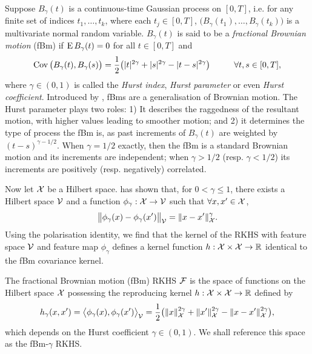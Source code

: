 Suppose $B_\gamma(t)$ is a continuous-time Gaussian process on $[0,T]$, i.e. for any finite set of indices $t_1,\dots,t_k$, where each $t_j \in [0,T]$, $\big(B_\gamma(t_1),\dots,B_\gamma(t_k)\big)$ is a multivariate normal random variable.
$B_\gamma(t)$ is said to be a \emph{fractional Brownian motion} (fBm) if $\operatorname{E} B_\gamma(t) = 0$ for all $t \in [0,T]$ and 
\[
  \operatorname{Cov}\big(B_\gamma(t),B_\gamma(s) \big) = \frac{1}{2}\big( |t|^{2\gamma} + |s|^{2\gamma} - |t-s|^{2\gamma} \big) \hspace{1cm} \forall t,s \in [0,T],
\]
where $\gamma \in (0,1)$ is called the \emph{Hurst index}, \emph{Hurst parameter} or even \emph{Hurst coefficient}.
Introduced by \citet{mandelbrot1968fractional}, fBms are a generalisation of Brownian motion.
The Hurst parameter plays two roles: 1) It describes the raggedness of the resultant motion, with higher values leading to smoother motion; and 2) it determines the type of process the fBm is, as past increments of $B_\gamma(t)$ are weighted by $(t-s)^{\gamma-1/2}$.
When $\gamma=1/2$ exactly, then the fBm is a standard Brownian motion and its increments are independent; when $\gamma > 1/2$ (resp. $\gamma < 1/2$) its increments are positively (resp. negatively) correlated.

Now let ${\mathcal X}$ be a Hilbert space. 
\cite{schoenberg1937} has shown that, for $0 < \gamma\leq 1$, there exists a Hilbert space ${\mathcal V}$ and a function $\phi_\gamma:{\mathcal X}\to{\mathcal V}$ such that $\forall x,x' \in {\mathcal X}$,
\[
  \big\Vert \phi_\gamma(x) - \phi_\gamma(x') \big\Vert_{\mathcal V} = \lVert x-x'\rVert_{\mathcal X}^\gamma.
\]
Using the polarisation identity, 
we find that the kernel of the RKHS with feature space ${\mathcal V}$ and feature map $\phi_\gamma$ defines a kernel function $h:{\mathcal X}\times{\mathcal X}\to\mathbb{R}$ identical to the fBm covariance kernel.

\begin{definition}\label{def:fbmrkhs}
  The fractional Brownian motion (fBm) RKHS ${\mathcal F}$ is the space of functions on the Hilbert space ${\mathcal X}$ possessing the reproducing kernel $h:{\mathcal X}\times{\mathcal X}\to\mathbb{R}$ defined by
  \[
    h_\gamma(x,x') = \big\langle \phi_\gamma(x), \phi_\gamma(x') \big\rangle_{\mathcal V} = \frac{1}{2}\big( \lVert x\rVert_{\mathcal X}^{2\gamma} + \lVert x'\rVert_{\mathcal X}^{2\gamma} - \lVert x-x'\rVert_{\mathcal X}^{2\gamma} \big),
  \]
  which depends on the Hurst coefficient $\gamma \in (0,1)$.
  We shall reference this space as the fBm-$\gamma$ RKHS.
\end{definition}

